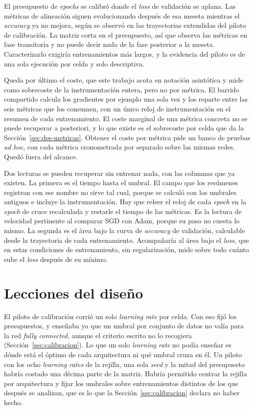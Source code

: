 El presupuesto de \emph{epochs} se calibró donde el \emph{loss} de validación se aplana. Las métricas de alineación siguen evolucionando después de esa meseta mientras el \emph{accuracy} ya no mejora, según se observó en las trayectorias extendidas del piloto de calibración. La matriz corta en el presupuesto, así que observa las métricas en fase transitoria y no puede decir nada de la fase posterior a la meseta. Caracterizarlo exigiría entrenamientos más largos, y la evidencia del piloto es de una sola ejecución por celda y solo descriptiva.

Queda por último el coste, que este trabajo acota en notación asintótica y mide como sobrecoste de la instrumentación entera, pero no por métrica. El barrido compartido calcula los gradientes por ejemplo una sola vez y los reparte entre las seis métricas que los consumen, con un único reloj de instrumentación en el resumen de cada entrenamiento. El coste marginal de una métrica concreta no se puede recuperar a posteriori, y lo que existe es el sobrecoste por celda que da la Sección~\ref{sec:des-metricas}. Obtener el coste por métrica pide un banco de pruebas \emph{ad hoc}, con cada métrica cronometrada por separado sobre las mismas redes. Quedó fuera del alcance.

Dos lecturas se pueden recuperar sin entrenar nada, con las columnas que ya existen. La primera es el tiempo hasta el umbral. El campo que los resúmenes registran con ese nombre no sirve tal cual, porque se calculó con los umbrales antiguos e incluye la instrumentación. Hay que releer el reloj de cada \emph{epoch} en la \emph{epoch} de cruce recalculada y restarle el tiempo de las métricas. Es la lectura de velocidad pertinente al comparar SGD con Adam, porque su paso no cuesta lo mismo. La segunda es el área bajo la curva de \emph{accuracy} de validación, calculable desde la trayectoria de cada entrenamiento. Acompañaría al área bajo el \emph{loss}, que en estas condiciones de entrenamiento, sin regularización, mide sobre todo cuánto sube el \emph{loss} después de su mínimo.

\section{Lecciones del diseño}
\label{sec:futuro-lecciones}

El piloto de calibración corrió un solo \emph{learning rate} por celda. Con eso fijó los presupuestos, y enseñaba ya que un umbral por conjunto de datos no valía para la red \emph{fully connected}, aunque el criterio escrito no lo recogiera (Sección~\ref{sec:calibracion}). Lo que un solo \emph{learning rate} no podía enseñar es dónde está el óptimo de cada arquitectura ni qué umbral cruza en él. Un piloto con los ocho \emph{learning rates} de la rejilla, una sola \emph{seed} y la mitad del presupuesto habría costado una décima parte de la matriz. Habría permitido centrar la rejilla por arquitectura y fijar los umbrales sobre entrenamientos distintos de los que después se analizan, que es lo que la Sección~\ref{sec:calibracion} declara no haber hecho.

